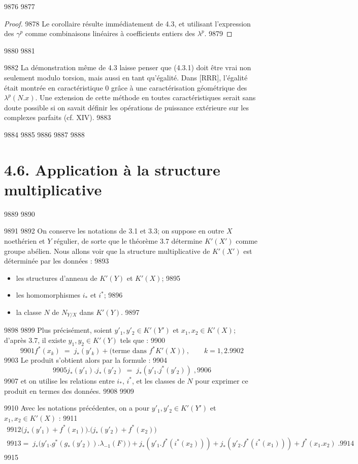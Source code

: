   9876	
  9877	\begin{proof}
  9878	Le corollaire résulte immédiatement de 4.3, et utilisant l'expression des $\gamma^p$ comme combinaisons linéaires à coefficients entiers des $\lambda^p$.
  9879	\end{proof}
  9880	
  9881	\begin{remarque}[4.5]%
  9882	La démonstration même de 4.3 laisse penser que (4.3.1) doit être vrai non seulement modulo torsion, mais aussi en tant qu'égalité. Dans [RRR], l'égalité était montrée en caractéristique 0 grâce à une caractérisation géométrique des $\lambda^p(N.x)$. Une extension de cette méthode en toutes caractéristiques serait sans doute possible si on savait définir les opérations de puissance extérieure sur les complexes parfaits (cf. XIV).
  9883	\end{remarque}
  9884	
  9885	\setcounter{section}{4}
  9886	\setcounter{proposition}{5}
  9887	
  9888	\section*{4.6. Application à la structure multiplicative}
  9889	
  9890	
  9891	
  9892	On conserve les notations de 3.1 et 3.3; on suppose en outre $X$ noethérien et $Y$ régulier, de sorte que le théorème 3.7 détermine $K'(X')$ comme groupe abélien. Nous allons voir que la structure multiplicative de $K'(X')$ est déterminée par les données :
  9893	\begin{itemize}
  9894	\item les structures d'anneau de $K'(Y)$ et $K'(X)$;
  9895	\item les homomorphismes $i_*$ et $i^*$;
  9896	\item la classe $N$ de $N_{Y/X}$ dans $K'(Y)$.
  9897	\end{itemize}
  9898	
  9899	Plus précisément, soient $y'_1, y'_2 \in K'(Y')$ et $x_1, x_2 \in K'(X)$; d'après 3.7, il existe $y_1, y_2 \in K'(Y)$ tels que :
  9900	\[
  9901	f^*(x_k) \; = \; j_*(y'_k) + \text{(terme dans } f^*K'(X)\text{)}\; , \qquad k=1,2.
  9902	\]
  9903	Le produit s'obtient alors par la formule :
  9904	\[
  9905	j_*(y'_1).j_*(y'_2) \; = \; j_*(y'_1 . j^*(y'_2))\; ,
  9906	\]
  9907	et on utilise les relations entre $i_*$, $i^*$, et les classes de $N$ pour exprimer ce produit en termes des données.
  9908	
  9909	\begin{proposition}[4.6]%
  9910	Avec les notations précédentes, on a pour $y'_1, y'_2 \in K'(Y')$ et $x_1, x_2 \in K'(X)$ :
  9911	\begin{multline*}
  9912	\bigl(j_*(y'_1) + f^*(x_1)\bigr) . \bigl(j_*(y'_2) + f^*(x_2)\bigr) \\
  9913	= \; j_*\bigl(y'_1.g^*(g_*(y'_2)).\lambda_{-1}(F)\bigr) + j_*(y'_1.f^*(i^*(x_2))) + j_*(y'_2.f^*(i^*(x_1))) + f^*(x_1.x_2)\; .
  9914	\end{multline*}
  9915	\end{proposition}
